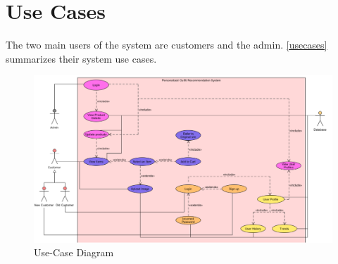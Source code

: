 \section{Use Cases}
The two main users of the system are customers and the admin. \autoref{usecases} summarizes their system use cases.
\begin{figure}[H]
\includegraphics[width=15cm]{images/UseCaseDiag.pdf} 
\centering
\caption{Use-Case Diagram}
\label{usecases}
\end{figure}


